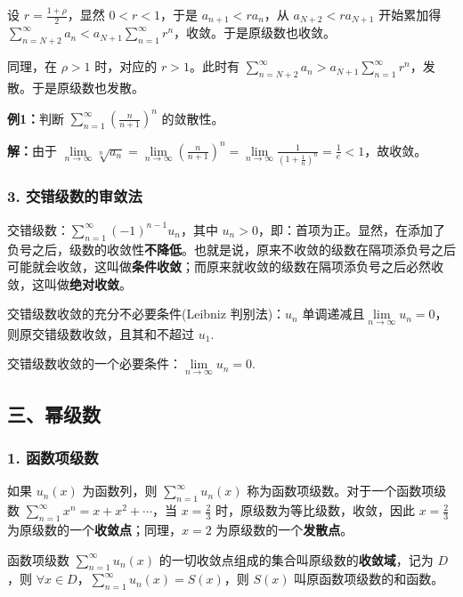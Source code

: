 \documentclass[b5paper]{ctexart}
\newcommand{\jst}{\sum \limits_{n = 1}^{\infty}}
\begin{document}
	设 $r = \frac{1 + \rho}{2}$，显然 $0 < r < 1$，于是 $a_{n + 1} < r a_n$，从 $a_{N + 2} < r a_{N + 1}$ 开始累加得 $\sum \limits_{n = N + 2}^{\infty} a_n < a_{N + 1} \jst r^n$，收敛。于是原级数也收敛。
	
	同理，在 $\rho > 1$ 时，对应的 $r > 1$。此时有 $\sum \limits_{n = N + 2}^{\infty} a_n > a_{N + 1} \jst r^n$，发散。于是原级数也发散。
	
	\vspace{12pt}
	
	\textbf{例1：}判断 $\jst (\frac{n}{n + 1}) ^n$ 的敛散性。
	
	\textbf{解：}由于 $\lim\limits_{n \to \infty} \sqrt[n]{a_n} = \lim\limits_{n \to \infty} (\frac{n}{n + 1})^n =  \lim\limits_{n \to \infty} \frac{1}{(1 + \frac{1}{n})^n} = \frac{1}{e} < 1$，故收敛。
	
	\subsubsection*{3. 交错级数的审敛法}
	
	交错级数：$\jst (-1)^{n - 1} u_n$，其中 $u_n > 0$，即：首项为正。显然，在添加了负号之后，级数的收敛性\textbf{不降低}。也就是说，原来不收敛的级数在隔项添负号之后可能就会收敛，这叫做\textbf{条件收敛}；而原来就收敛的级数在隔项添负号之后必然收敛，这叫做\textbf{绝对收敛}。
	
	交错级数收敛的充分不必要条件(Leibniz 判别法)：$u_n$ 单调递减且$\lim\limits_{n \to \infty} u_n = 0$，则原交错级数收敛，且其和不超过 $u_1$.
	
	交错级数收敛的一个必要条件：$\lim\limits_{n \to \infty} u_n = 0$.
	
	\subsection*{三、幂级数}
	
	\subsubsection*{1. 函数项级数}
	
	如果 ${u_n(x)}$ 为函数列，则 $\jst u_n(x)$ 称为函数项级数。对于一个函数项级数 $\jst x^n = x + x^2 + \cdots$，当 $x = \frac{2}{3}$ 时，原级数为等比级数，收敛，因此 $x = \frac{2}{3}$ 为原级数的一个\textbf{收敛点}；同理，$x = 2$ 为原级数的一个\textbf{发散点}。
	
	函数项级数 $\jst u_n(x)$ 的一切收敛点组成的集合叫原级数的\textbf{收敛域}，记为 $D$，则 $\forall x \in D$，$\jst u_n(x) = S(x)$，则 $S(x)$ 叫原函数项级数的和函数。
	
\end{document}
